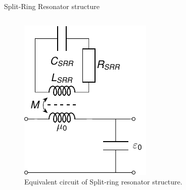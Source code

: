 \begin{frame}{Split-Ring Resonator structure}
\begin{columns}
        \vspace{-4mm}
        \begin{figure}
            \centering
            \includegraphics[width=\textwidth]{Figures/TL_negative_permeability.pdf}
            \caption{Equivalent circuit of Split-ring resonator structure.}
            \label{fig:TL_negative_permeability}
        \end{figure}
        
    \end{columns}
\end{frame}